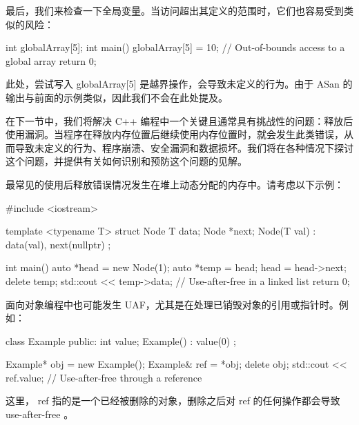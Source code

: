 
最后，我们来检查一下全局变量。当访问超出其定义的范围时，它们也容易受到类似的风险：

\begin{cpp}
int globalArray[5];
int main() {
    globalArray[5] = 10; // Out-of-bounds access to a global array
    return 0;
}
\end{cpp}

此处，尝试写入 globalArray[5] 是越界操作，会导致未定义的行为。由于 ASan 的输出与前面的示例类似，因此我们不会在此处提及。


在下一节中，我们将解决 C++ 编程中一个关键且通常具有挑战性的问题：释放后使用漏洞。当程序在释放内存位置后继续使用内存位置时，就会发生此类错误，从而导致未定义的行为、程序崩溃、安全漏洞和数据损坏。我们将在各种情况下探讨这个问题，并提供有关如何识别和预防这个问题的见解。


最常见的使用后释放错误情况发生在堆上动态分配的内存中。请考虑以下示例：

\begin{cpp}
#include <iostream>

template <typename T>
struct Node {
    T data;
    Node *next;
    Node(T val) : data(val), next(nullptr) {}
};

int main() {
    auto *head = new Node(1);
    auto *temp = head;
    head = head->next;
    delete temp;
    std::cout << temp->data; // Use-after-free in a linked list
    return 0;
}
\end{cpp}


面向对象编程中也可能发生 UAF，尤其是在处理已销毁对象的引用或指针时。例如：

\begin{cpp}
class Example {
    public:
    int value;
    Example() : value(0) {}
};

Example* obj = new Example();
Example& ref = *obj;
delete obj;
std::cout << ref.value; // Use-after-free through a reference
\end{cpp}

这里， ref 指的是一个已经被删除的对象，删除之后对 ref 的任何操作都会导致 use-after-free 。


